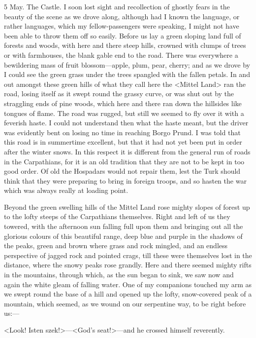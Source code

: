 \begin{diary}{5 May. The Castle.}
I soon lost sight and recollection of ghostly fears in the beauty of the scene as we drove along, although had I known the language, or rather languages, which my fellow-passengers were speaking, I might not have been able to throw them off so easily. Before us lay a green sloping land full of forests and woods, with here and there steep hills, crowned with clumps of trees or with farmhouses, the blank gable end to the road. There was everywhere a bewildering mass of fruit blossom—apple, plum, pear, cherry; and as we drove by I could see the green grass under the trees spangled with the fallen petals. In and out amongst these green hills of what they call here the <Mittel Land> ran the road, losing itself as it swept round the grassy curve, or was shut out by the straggling ends of pine woods, which here and there ran down the hillsides like tongues of flame. The road was rugged, but still we seemed to fly over it with a feverish haste. I could not understand then what the haste meant, but the driver was evidently bent on losing no time in reaching Borgo Prund. I was told that this road is in summertime excellent, but that it had not yet been put in order after the winter snows. In this respect it is different from the general run of roads in the Carpathians, for it is an old tradition that they are not to be kept in too good order. Of old the Hospadars would not repair them, lest the Turk should think that they were preparing to bring in foreign troops, and so hasten the war which was always really at loading point.

Beyond the green swelling hills of the Mittel Land rose mighty slopes of forest up to the lofty steeps of the Carpathians themselves. Right and left of us they towered, with the afternoon sun falling full upon them and bringing out all the glorious colours of this beautiful range, deep blue and purple in the shadows of the peaks, green and brown where grass and rock mingled, and an endless perspective of jagged rock and pointed crags, till these were themselves lost in the distance, where the snowy peaks rose grandly. Here and there seemed mighty rifts in the mountains, through which, as the sun began to sink, we saw now and again the white gleam of falling water. One of my companions touched my arm as we swept round the base of a hill and opened up the lofty, snow-covered peak of a mountain, which seemed, as we wound on our serpentine way, to be right before us:—

<Look! Isten szek!>—<God's seat!>—and he crossed himself reverently.


\end{diary}
